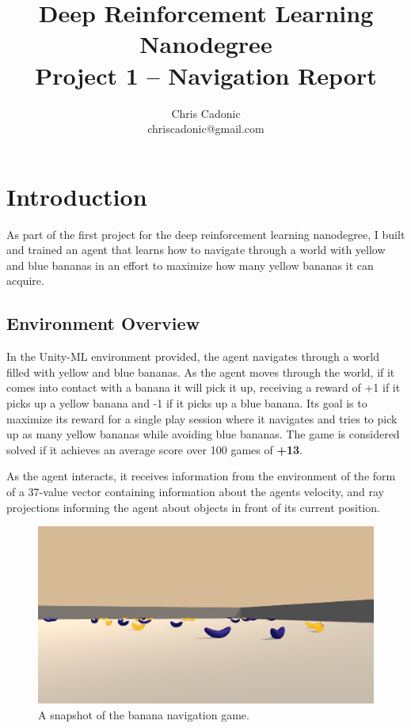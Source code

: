 \documentclass[11pt]{article}
\begin{document}
\title{Deep Reinforcement Learning Nanodegree\\
	   Project 1 -- Navigation Report}
\author{\vspace{-1mm}Chris Cadonic\\
chriscadonic@gmail.com}
\maketitle
\vspace{-1.5em}

\section{Introduction}

As part of the first project for the deep reinforcement learning nanodegree, I built and trained an agent that learns how to navigate through a world with yellow and blue bananas in an effort to maximize how many yellow bananas it can acquire.

\subsection{Environment Overview}

In the Unity-ML environment provided, the agent navigates through a world filled with yellow and blue bananas. As the agent moves through the world, if it comes into contact with a banana it will pick it up, receiving a reward of +1 if it picks up a yellow banana and -1 if it picks up a blue banana. Its goal is to maximize its reward for a single play session where it navigates and tries to pick up as many yellow bananas while avoiding blue bananas. The game is considered solved if it achieves an average score over 100 games of \textbf{+13}.

As the agent interacts, it receives information from the environment of the form of a 37-value vector containing information about the agents velocity, and ray projections informing the agent about objects in front of its current position.


\FloatBarrier

\begin{figure}[!ht]
	\centering
	\includegraphics[width=0.75\linewidth]{images/example-game-image.png}
	\caption{A snapshot of the banana navigation game.}
	\label{fig:example-game-image}
\end{figure}
\end{document}
